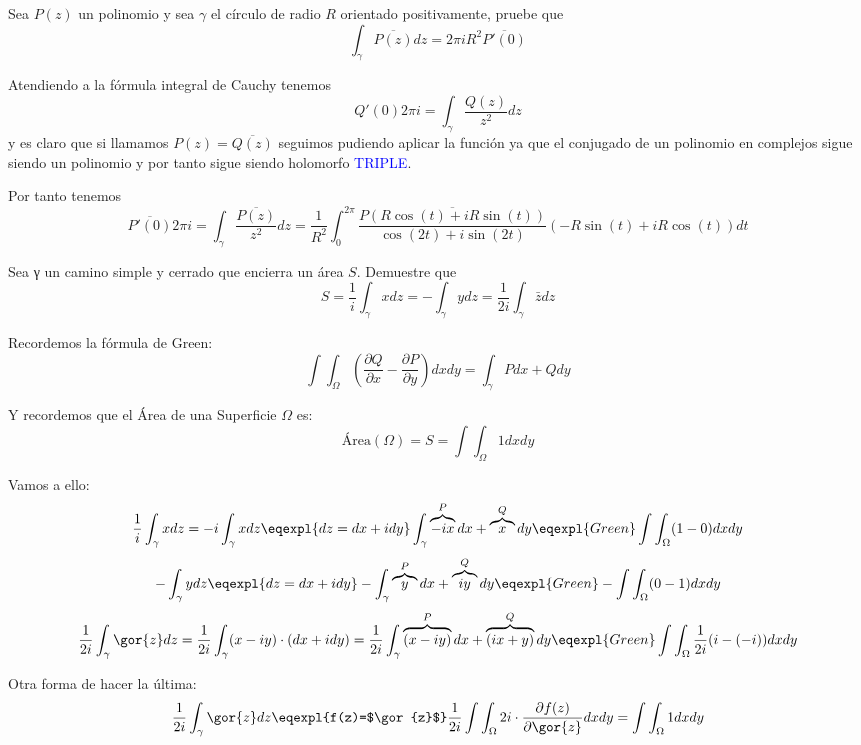 \begin{problem}[7]
Sea $P(z)$ un polinomio y sea $γ$ el círculo de radio $R$ orientado positivamente, pruebe que
\[\int_γ \overline{P(z)}dz = 2πiR^2\overline{P'(0)}\]

\solution


Atendiendo a la fórmula integral de Cauchy tenemos
\[Q'(0)2πi= \int_γ \frac{Q(z)}{z^2}dz\]
y es claro que si llamamos $P(z)=\overline{Q(z)}$ seguimos pudiendo aplicar la función ya que el conjugado de un polinomio en complejos sigue siendo un polinomio y por tanto sigue siendo holomorfo \textcolor{blue}{TRIPLE}.

Por tanto tenemos
\[\overline{P'(0)}2πi=\int_γ\frac{\overline{P(z)}}{z^2}dz=\frac{1}{R^2}\int_0^{2π}\frac{\overline{P(R\cos(t)+iR\sin(t))}}{\cos(2t)+i\sin(2t)}(-R\sin(t)+iR\cos(t))dt\]





\end{problem}

\begin{problem}[8]
Sea γ un camino simple y cerrado que encierra un área $S$. Demuestre que
\[S = \frac{1}{i}\int_γ xdz = -\int_γ ydz = \frac{1}{2i}\int_γ \bar{z}dz\]
\solution

Recordemos la fórmula de Green:
\[\int\int_\Omega \left(\frac{\partial Q}{\partial x}-\frac{\partial P}{\partial y}\right)dx dy = \int_\gamma Pdx + Qdy \]

Y recordemos que el Área de una Superficie $\Omega$ es:
\[ \text{Área}(\Omega) = S = \int\int_\Omega 1 dx dy\] 

Vamos a ello:
\[ \frac{1}{i}\int_\gamma x dz = -i \int_\gamma x dz \eqexpl{dz=dx+idy} \int_\gamma \overbrace{-ix}^P dx + \overbrace{x}^Q dy \eqexpl{Green} \int\int_\Omega (1-0) dx dy \]
\[ - \int_\gamma y dz \eqexpl{dz=dx+idy} -\int_\gamma \overbrace{y}^P dx + \overbrace{iy}^Q dy \eqexpl{Green} - \int\int_\Omega (0-1) dx dy \]
\[ \frac{1}{2i}\int_\gamma \gor{z} dz = \frac{1}{2i} \int_\gamma (x-iy) \cdot (dx+idy) = \frac{1}{2i} \int_\gamma \overbrace{(x-iy)}^P dx + \overbrace{(ix+y)}^Q dy \eqexpl{Green} \int\int_\Omega \frac{1}{2i} (i-(-i))dxdy \]

Otra forma de hacer la última:
\[ \frac{1}{2i}\int_\gamma \gor{z} dz \eqexpl{f(z)=$\gor{z}$} \frac{1}{2i} \int\int_\Omega 2i\cdot \frac{\partial f(z)}{\partial \gor{z}} dxdy = \int\int_\Omega 1 dxdy \]

\end{problem}

